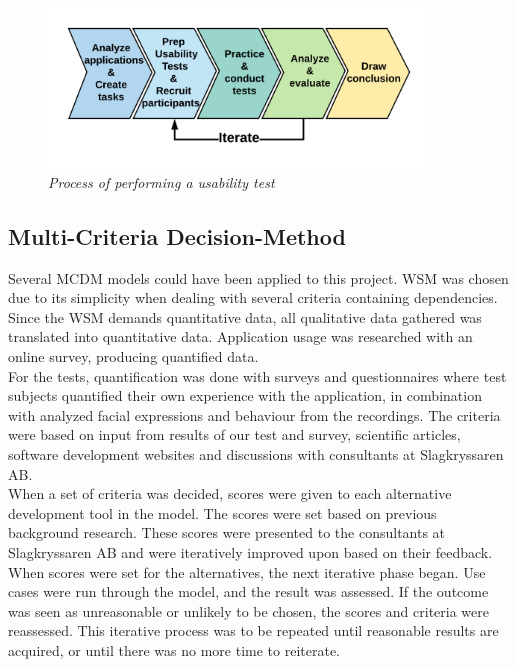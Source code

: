 \begin{figure}[ht]
	\centering 
    \includegraphics[width=0.9\textwidth]{img/usability_test_process.png}
	\hfill
	\caption{\textit{Process of performing a usability test}}
\end{figure}

\subsection{Multi-Criteria Decision-Method}

Several MCDM models could have been applied to this project. WSM was chosen due to its simplicity when dealing with several criteria containing dependencies. Since the WSM demands quantitative data, all qualitative data gathered was translated into quantitative data. 
Application usage was researched with an online survey, producing quantified data. \\
For the tests, quantification was done with surveys and questionnaires where test subjects quantified their own experience with the application, in combination with analyzed facial expressions and behaviour from the recordings. 
The criteria were based on input from results of our test and survey, scientific articles, software development websites and discussions with consultants at Slagkryssaren AB. \\
When a set of criteria was decided, scores were given to each alternative development tool in the model. The scores were set based on previous background research. These scores were presented to the consultants at Slagkryssaren AB and were iteratively improved upon based on their feedback. \\
When scores were set for the alternatives, the next iterative phase began. 
Use cases were run through the model, and the result was assessed. If the outcome was seen as unreasonable or unlikely to be chosen, the scores and criteria were reassessed. This iterative process was to be repeated until reasonable results are acquired, or until there was no more time to reiterate. 
